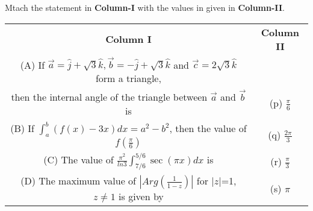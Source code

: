\item Mtach the statement in \textbf{Column-I} with the values in given in \textbf{Column-II}.
\begin{table}[ht!]
\centering
\begin{tabular}{c c} 
 \textbf{Column I} & \textbf{Column II}\\ [0.5ex] 
 (A) If $\overrightarrow{a}=\hat{j}+\sqrt{3}\hat{k}, \overrightarrow{b}
     =-\hat{j}+\sqrt{3}\hat{k}$ and $\overrightarrow{c}=2\sqrt{3}\hat{k}$
     form a triangle,\\ then the internal angle of the triangle between
     $\overrightarrow{a}$ and $\overrightarrow{b}$ is                             &(p) $\frac{\pi}{6}$\\ 
 (B) If $\int_{a}^{b}(f(x)-3x)dx=a^2-b^2$, then the value of $f(\frac{\pi}{6})$   &(q) $\frac{2\pi}{3}$\\
 (C) The value of $\frac{\pi^{2}}{ln3}\int_{7/6}^{5/6}\sec(\pi x)dx$ is           &(r) $\frac{\pi}{3}$\\
 (D) The maximum value of $|Arg(\frac{1}{1-z})|$ for $|z|$=1, 
     $z \neq 1$ is given by                                                       &(s) $\pi$\\[1ex] 

\end{tabular}
\end{table}

